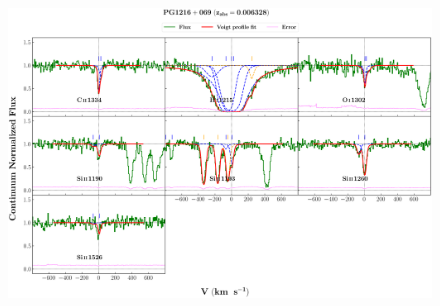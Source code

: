 \documentclass[12pt,draft]{report}
\begin{document}
\newpage

\begin{landscape}

\begin{figure}
    \centering
    \vspace{-20mm}
    \hspace*{-35mm}
    \includegraphics[width=1.25\linewidth]{System-Plots/PG1216+069_z=0.006328_sys_plot.png}
\end{figure}

\end{landscape}
\end{document}
